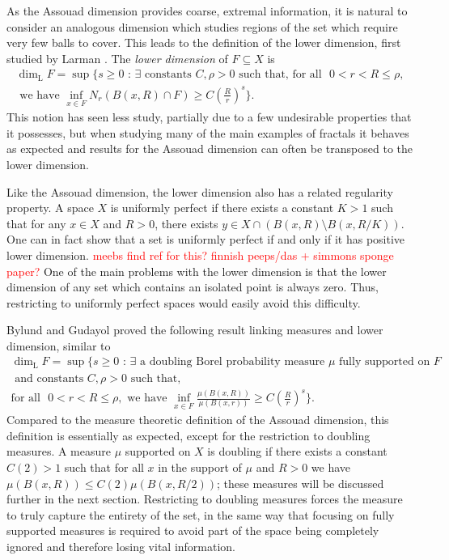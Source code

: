 As the Assouad dimension provides coarse, extremal information, it is natural to consider an analogous dimension which studies regions of the set which require very few balls to cover. This leads to the definition of the lower dimension, first studied by Larman \cite{larman1,larman2}. The \textit{lower dimension} of $F \subseteq X$ is 
\begin{multline*}
\dim_{\text{L}} F = \sup \Bigg\{ s \geq 0 \, \,  : \, \exists \text{ constants }C, \rho > 0 \text{ such that, for all } \, \, 0< r< R \leq \rho,\\ \text{ we have  }\inf_{x\in F} N_r (B(x,R)\cap F) \geq C\left(\frac{R}{r}\right)^{s} \Bigg\}.
\end{multline*}
This notion has seen less study, partially due to a few undesirable properties that it possesses, but when studying many of the main examples of fractals it behaves as expected and results for the Assouad dimension can often be transposed to the lower dimension. 

Like the Assouad dimension, the lower dimension also has a related regularity property. A space $X$ is uniformly perfect if there exists a constant $K > 1$ such that for any $x \in X$ and $R > 0$, there exists $y \in X \cap \left(B(x, R) \setminus B(x, R/K)\right)$. One can in fact show that a set is uniformly perfect if and only if it has positive lower dimension. \textcolor{red}{meebs find ref for this? finnish peeps/das + simmons sponge paper?} One of the main problems with the lower dimension is that the lower dimension of any set which contains an isolated point is always zero. Thus, restricting to uniformly perfect spaces would easily avoid this difficulty. 

Bylund and Gudayol \cite{bylund-g} proved the following result linking measures and lower dimension, similar to \cite{luksak-saksman, konyagin-volberg}
\begin{multline*}
\dim_{\text{L}} F = \sup \Bigg\{ s \geq 0 \, \,  : \, \exists \text{ a doubling Borel probability measure } \mu \text{ fully supported on }F \\ \text{ and constants }C, \rho > 0  \text{ such that, } \\ \text{for all } \, \, 0< r< R \leq \rho, \text{ we have  }\inf_{x\in F} \frac{\mu(B(x,R))}{\mu(B(x,r))} \geq C\left(\frac{R}{r}\right)^{s} \Bigg\}.
\end{multline*}
Compared to the measure theoretic definition of the Assouad dimension, this definition is essentially as expected, except for the restriction to doubling measures. A measure $\mu$ supported on $X$ is doubling if there exists a constant $C(2) > 1$ such that for all $x$ in the support of $\mu$ and $R > 0$ we have $\mu( B(x,R)) \le C(2) \mu(B(x,R/2))$; these measures will be discussed further in the next section. Restricting to doubling measures forces the measure to truly capture the entirety of the set, in the same way that focusing on fully supported measures is required to avoid part of the space being completely ignored and therefore losing vital information.


